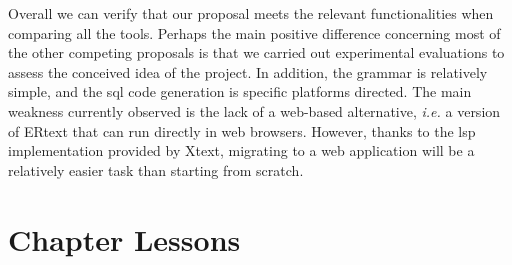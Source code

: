 Overall we can verify that our proposal meets the relevant functionalities when comparing all the tools.
Perhaps the main positive difference concerning most of the other competing proposals is that we carried out experimental evaluations to assess the conceived idea of the project. In addition, the grammar is relatively simple, and the \ac{sql} code generation is specific platforms directed.
The main weakness currently observed is the lack of a web-based alternative, \textit{i.e.} a version of ERtext that can run directly in web browsers.
However, thanks to the \ac{lsp} implementation provided by Xtext, migrating to a web application will be a relatively easier task than starting from scratch.

\section{Chapter Lessons} \label{sec_slm:lessons}

